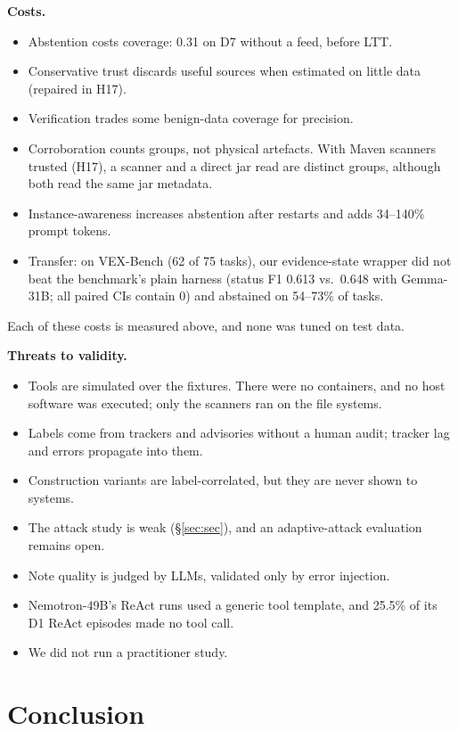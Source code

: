 \documentclass[conference]{IEEEtran}
\begin{document}
\textbf{Costs.}
\begin{itemize}
\item Abstention costs coverage: 0.31 on D7 without a feed, before LTT.
\item Conservative trust discards useful sources when estimated on little data (repaired in H17).
\item Verification trades some benign-data coverage for precision.
\item Corroboration counts groups, not physical artefacts. With Maven scanners trusted (H17), a scanner
  and a direct jar read are distinct groups, although both read the same jar metadata.
\item Instance-awareness increases abstention after restarts and adds 34--140\% prompt tokens.
\item Transfer: on VEX-Bench (62 of 75 tasks), our evidence-state wrapper did not beat the benchmark's
  plain harness (status F1 0.613 vs.\ 0.648 with Gemma-31B; all paired CIs contain 0) and abstained on
  54--73\% of tasks.
\end{itemize}
Each of these costs is measured above, and none was tuned on test data.

\textbf{Threats to validity.}
\begin{itemize}
\item Tools are simulated over the fixtures. There were no containers, and no host software was
  executed; only the scanners ran on the file systems.
\item Labels come from trackers and advisories without a human audit; tracker lag and errors propagate
  into them.
\item Construction variants are label-correlated, but they are never shown to systems.
\item The attack study is weak (\S\ref{sec:sec}), and an adaptive-attack evaluation remains open.
\item Note quality is judged by LLMs, validated only by error injection.
\item Nemotron-49B's ReAct runs used a generic tool template, and 25.5\% of its D1 ReAct episodes made no
  tool call.
\item We did not run a practitioner study.
\end{itemize}

\section{Conclusion}
\end{document}
